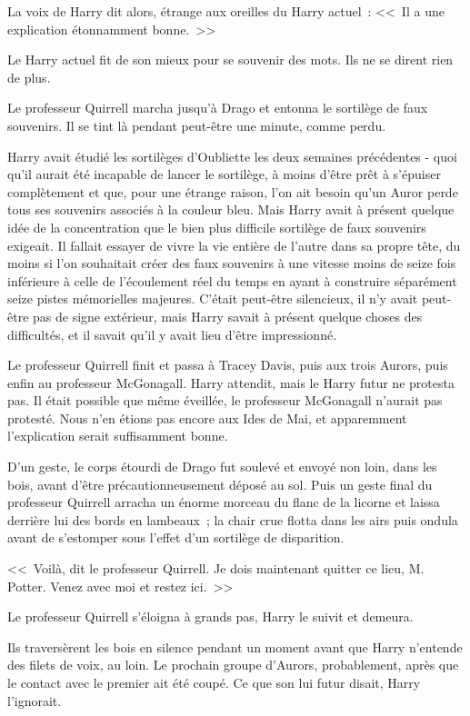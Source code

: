 La voix de Harry dit alors, étrange aux oreilles du Harry actuel~: <<~Il a une explication étonnamment bonne.~>>

Le Harry actuel fit de son mieux pour se souvenir des mots. Ils ne se dirent rien de plus.

Le professeur Quirrell marcha jusqu'à Drago et entonna le sortilège de faux souvenirs. Il se tint là pendant peut-être une minute, comme perdu.

Harry avait étudié les sortilèges d'Oubliette les deux semaines précédentes - quoi qu'il aurait été incapable de lancer le sortilège, à moins d'être prêt à s'épuiser complètement et que, pour une étrange raison, l'on ait besoin qu'un Auror perde tous ses souvenirs associés à la couleur bleu. Mais Harry avait à présent quelque idée de la concentration que le bien plus difficile sortilège de faux souvenirs exigeait. Il fallait essayer de vivre la vie entière de l'autre dans sa propre tête, du moins si l'on souhaitait créer des faux souvenirs à une vitesse moins de seize fois inférieure à celle de l'écoulement réel du temps en ayant à construire séparément seize pistes mémorielles majeures. C'était peut-être silencieux, il n'y avait peut-être pas de signe extérieur, mais Harry savait à présent quelque choses des difficultés, et il savait qu'il y avait lieu d'être impressionné.

Le professeur Quirrell finit et passa à Tracey Davis, puis aux trois Aurors, puis enfin au professeur McGonagall. Harry attendit, mais le Harry futur ne protesta pas. Il était possible que même éveillée, le professeur McGonagall n'aurait pas protesté. Nous n'en étions pas encore aux Ides de Mai, et apparemment l'explication serait suffisamment bonne.

D'un geste, le corps étourdi de Drago fut soulevé et envoyé non loin, dans les bois, avant d'être précautionneusement déposé au sol. Puis un geste final du professeur Quirrell arracha un énorme morceau du flanc de la licorne et laissa derrière lui des bords en lambeaux~; la chair crue flotta dans les airs puis ondula avant de s'estomper sous l'effet d'un sortilège de disparition.

<<~Voilà, dit le professeur Quirrell. Je dois maintenant quitter ce lieu, M. Potter. Venez avec moi et restez ici.~>>

Le professeur Quirrell s'éloigna à grands pas, Harry le suivit et demeura.

Ils traversèrent les bois en silence pendant un moment avant que Harry n'entende des filets de voix, au loin. Le prochain groupe d'Aurors, probablement, après que le contact avec le premier ait été coupé. Ce que son lui futur disait, Harry l'ignorait.

